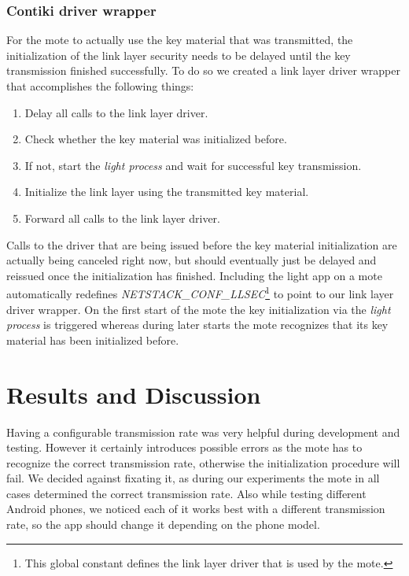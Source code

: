 \documentclass{sig-alternate} %
\begin{document}
\subsubsection{Contiki driver wrapper}
\label{ssub:contiki_driver_wrapper}

For the mote to actually use the key material that was transmitted, the initialization of the link layer security needs to be delayed until the key transmission finished successfully.
To do so we created a link layer driver wrapper that accomplishes the following things:

\begin{enumerate}
	\item Delay all calls to the link layer driver.
	\item Check whether the key material was initialized before.
	\item If not, start the \textit{light process} and wait for successful key transmission.
	\item Initialize the link layer using the transmitted key material.
	\item Forward all calls to the link layer driver.
\end{enumerate}

Calls to the driver that are being issued before the key material initialization are actually being canceled right now, but should eventually just be delayed and reissued once the initialization has finished.
Including the light app on a mote automatically redefines \textit{NETSTACK\_CONF\_LLSEC}\footnote{This global constant defines the link layer driver that is used by the mote.} to point to our link layer driver wrapper.
On the first start of the mote the key initialization via the \textit{light process} is triggered whereas during later starts the mote recognizes that its key material has been initialized before.


\section{Results and Discussion}
\label{sec:results_and_discussion}

Having a configurable transmission rate was very helpful during development and testing.
However it certainly introduces possible errors as the mote has to recognize the correct transmission rate, otherwise the initialization procedure will fail.
We decided against fixating it, as during our experiments the mote in all cases determined the correct transmission rate.
Also while testing different Android phones, we noticed each of it works best with a different transmission rate, so the app should change it depending on the phone model.
\end{document}
